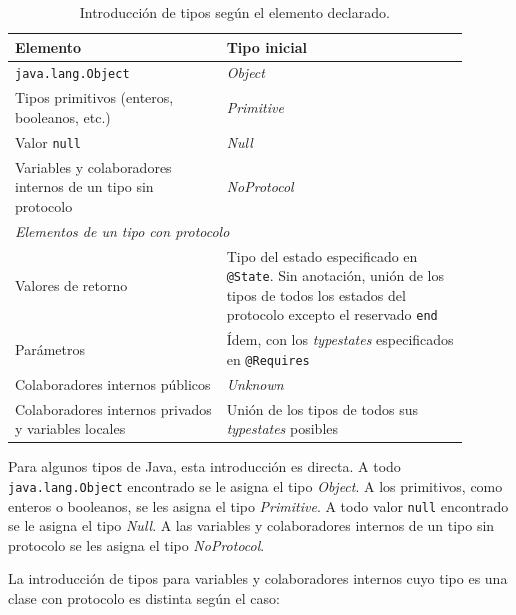 \begin{table}[htbp]
    \centering
    \renewcommand{\arraystretch}{1.3}
    \begin{tabular}{|p{0.42\linewidth}|p{0.48\linewidth}|}
        \hline
        \textbf{Elemento} & \textbf{Tipo inicial} \\
        \hline
        \texttt{java.lang.Object} & \textit{Object} \\
        \hline
        Tipos primitivos (enteros, booleanos, etc.) & \textit{Primitive} \\
        \hline
        Valor \texttt{null} & \textit{Null} \\
        \hline
        Variables y colaboradores internos de un tipo sin protocolo & \textit{NoProtocol} \\
        \hline
        \multicolumn{2}{|l|}{\textit{Elementos de un tipo con protocolo}} \\
        \hline
        Valores de retorno & Tipo del estado especificado en \texttt{@State}. Sin anotación, unión de los tipos de todos los estados del protocolo excepto el reservado \texttt{end} \\
        \hline
        Parámetros & Ídem, con los \textit{typestates} especificados en \texttt{@Requires} \\
        \hline
        Colaboradores internos públicos & \textit{Unknown} \\
        \hline
        Colaboradores internos privados y variables locales & Unión de los tipos de todos sus \textit{typestates} posibles \\
        \hline
    \end{tabular}
    \caption{Introducción de tipos según el elemento declarado.}
    \label{tab:introduccion-tipos}
\end{table}

Para algunos tipos de Java, esta introducción es directa. A todo \texttt{java.lang.Object} encontrado se le asigna el tipo \textit{Object}. A los primitivos, como enteros o booleanos, se les asigna el tipo \textit{Primitive}. A todo valor \texttt{null} encontrado se le asigna el tipo \textit{Null}. A las variables y colaboradores internos de un tipo sin protocolo se les asigna el tipo \textit{NoProtocol}.

La introducción de tipos para variables y colaboradores internos cuyo tipo es una clase con protocolo es distinta según el caso:

